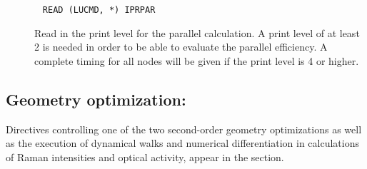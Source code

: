 \begin{description}
%
%
\item[]\verb| |\newline
\verb|READ (LUCMD, *) IPRPAR|

Read in the print level for the parallel calculation. A print level of
at least 2 is needed in order to be able to evaluate the
parallel efficiency. A complete
timing for all nodes will be
given if the print level is 4 or higher.
\end{description}

\subsection{Geometry optimization: }
\label{sec:abawalk}

Directives controlling one of the two second-order
geometry
optimizations  as well as the
execution of dynamical walks and numerical
differentiation in
calculations of Raman intensities and optical activity,
appear in the  section.

